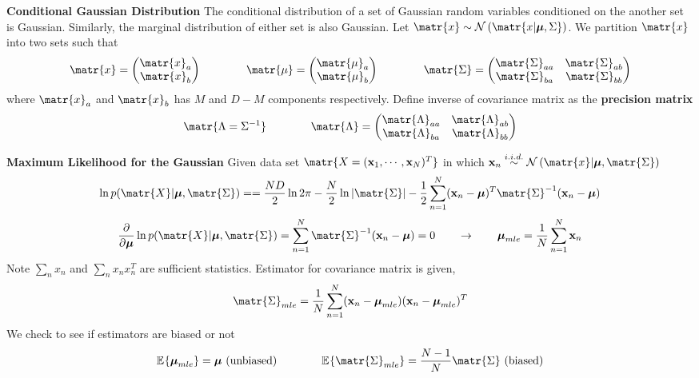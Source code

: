 \documentclass[11pt]{article}
\begin{document}
\begin{defn*}
    \textbf{Conditional Gaussian Distribution} The conditional distribution of a set of Gaussian random variables conditioned on the another set is Gaussian. Similarly, the marginal distribution of either set is also Gaussian. Let $\matr{x} \sim \normal{\matr{x | \bmu, \Sigma}}$. We partition $\matr{x}$ into two sets such that 
    \[
        \matr{x} = 
        \begin{pmatrix}
            \matr{x}_a \\ \matr{x}_b
        \end{pmatrix}    
        \quad \quad \quad \quad 
        \matr{\mu} = 
        \begin{pmatrix}
            \matr{\mu}_a \\
            \matr{\mu}_b \\ 
        \end{pmatrix}
        \quad \quad \quad \quad 
        \matr{\Sigma} = 
        \begin{pmatrix}
            \matr{\Sigma}_{aa} & \matr{\Sigma}_{ab} \\
            \matr{\Sigma}_{ba} & \matr{\Sigma}_{bb} \\
        \end{pmatrix}
    \]
    where $\matr{x}_a$ and $\matr{x}_b$ has $M$ and $D-M$ components respectively. Define inverse of covariance matrix as the \textbf{precision matrix}
    \[
        \matr{\Lambda = \Sigma^{-1}}    
        \quad \quad \quad \quad 
        \matr{\Lambda} = 
        \begin{pmatrix}
            \matr{\Lambda}_{aa} & \matr{\Lambda}_{ab} \\
            \matr{\Lambda}_{ba} & \matr{\Lambda}_{bb}\\
        \end{pmatrix}
    \]
\end{defn*}



\begin{defn*}
    \textbf{Maximum Likelihood for the Gaussian} Given data set $\matr{X = (\bx_1, \cdots, \bx_N)^T}$ in which $\bx_n \overset{i.i.d.}{\sim} \normal{\matr{x}| \bmu, \matr{\Sigma}}$
    \[
        \ln{p(\matr{X}|\bmu, \matr{\Sigma})} = 
        = \frac{ND}{2} \ln{2\pi} - \frac{N}{2} \ln{|\matr{\Sigma}|} - \frac{1}{2} \sum_{n=1}^N (\bx_n - \bmu)^T \matr{\Sigma}^{-1}(\bx_n - \bmu)
    \]
    \[
        \frac{\partial}{\partial \bmu}  \ln{p(\matr{X}|\bmu, \matr{\Sigma})} = 
        \sum_{n=1}^N \matr{\Sigma}^{-1} (\bx_n - \bmu) = 0
        \quad \quad \rightarrow \quad \quad 
        \bmu_{mle} = \frac{1}{N}\sum_{n=1}^N \bx_n
    \]
    Note $\textstyle\sum_n x_n$ and $\textstyle \sum_n x_n x_n^T$ are sufficient statistics. Estimator for covariance matrix is given,
    \[
        \matr{\Sigma}_{mle} = \frac{1}{N}\sum_{n=1}^N (\bx_n - \bmu_{mle})(\bx_n - \bmu_{mle})^T
    \]
    We check to see if estimators are biased or not 
    \[
        \E{\bmu_{mle}} = \bmu \text{ (unbiased)}
        \quad \quad \quad \quad 
        \E{\matr{\Sigma}_{mle}} = \frac{N-1}{N} \matr{\Sigma} \text{ (biased)}
    \]
\end{defn*}


\end{document}
